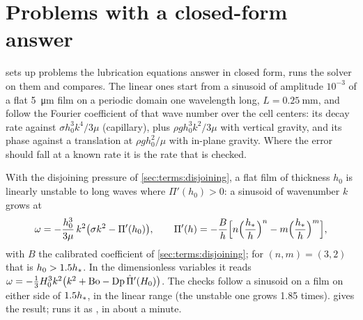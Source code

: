\section{Problems with a closed-form answer}
\label{sec:verification:analytic}

 sets up problems the lubrication equations answer in
closed form, runs the solver on them and compares. The linear ones start from
a sinusoid of amplitude $10^{-3}$ of a flat \SI{5}{\micro\metre} film on a
periodic domain one wavelength long, $L = \SI{0.25}{\milli\metre}$, and follow
the Fourier coefficient of that wave number over the cell centers: its decay
rate against $\sigma h_0^3 k^4/3\mu$ (capillary), plus $\rho g h_0^3 k^2/3\mu$
with vertical gravity, and its phase against a translation at
$\rho g h_0^2/\mu$ with in-plane gravity. Where the error should fall at a known
rate it is the rate that is checked.

With the disjoining pressure of \cref{sec:terms:disjoining}, a flat film of
thickness $h_0$ is linearly unstable to long waves where $\Pi'(h_0) > 0$: a
sinusoid of wavenumber $k$ grows at
\begin{equation}
  \omega = -\frac{h_0^3}{3\mu}\,k^2\bigl(\sigma k^2 - \Pi'(h_0)\bigr),\qquad
  \Pi'(h) = -\frac{B}{h}\Bigl[n\Bigl(\frac{h_{*}}{h}\Bigr)^{n} - m\Bigl(\frac{h_{*}}{h}\Bigr)^{m}\Bigr],
  \label{eq:spinodal}
\end{equation}
with $B$ the calibrated coefficient of \cref{sec:terms:disjoining}; for
$(n,m) = (3,2)$ that is $h_0 > 1.5h_{*}$. In the dimensionless variables it
reads $\omega = -\tfrac13 H_0^3k^2\bigl(k^2 + \mathrm{Bo} - \mathrm{Dp}\,\hat{\Pi}'(H_0)\bigr)$.
The  checks follow a sinusoid on a film on either side of
$1.5h_{*}$, in the linear range (the unstable one grows 1.85 times).
 gives the result;
 runs it as , in about a minute.

